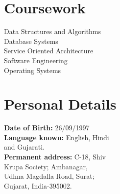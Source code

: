 \documentclass[]{denish-resume-openfont}
\begin{document}
\begin{minipage}[t]{0.3\textwidth}

\section{Coursework}
\textbullet{} Data Structures and Algorithms\\
\textbullet{} Database Systems \\
\textbullet{} Service Oriented Architecture \\
\textbullet{} Software Engineering \\
\textbullet{} Operating Systems \\
\sectionsep


\section{Personal Details}
\textbullet{} \textbf{Date of Birth:} 26/09/1997 \\
\textbullet{} \textbf{Language known:} English, Hindi\\ \hspace{3mm} and Gujarati.\\
\textbullet{} \textbf{Permanent address:} C-18, Shiv \\
\hspace{3mm} Krupa Society; Ambanagar, \\
\hspace{3mm} Udhna Magdalla Road, Surat; \\ \hspace{3mm} Gujarat, India-395002.
\sectionsep

%
%

\end{minipage}
\hfill
\end{document}
